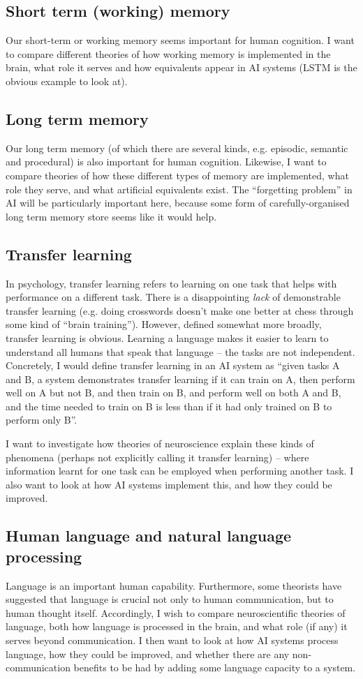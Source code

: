 \documentclass[10pt,a4paper]{article}
\newcommand{\nquote}[1]{``{#1}''}
\begin{document}
\subsection{Short term (working) memory}
Our short-term or working memory seems important for human cognition. I want to compare different theories of how working memory is implemented in the brain, what role it serves and how equivalents appear in AI systems (LSTM is the obvious example to look at).

\subsection{Long term memory}
Our long term memory (of which there are several kinds, e.g. episodic, semantic and procedural) is also important for human cognition. Likewise, I want to compare theories of how these different types of memory are implemented, what role they serve, and what artificial equivalents exist. The \nquote{forgetting problem} in AI will be particularly important here, because some form of carefully-organised long term memory store seems like it would help.

\subsection{Transfer learning}
In psychology, transfer learning refers to learning on one task that helps with performance on a different task. There is a disappointing \emph{lack} of demonstrable transfer learning (e.g. doing crosswords doesn't make one better at chess through some kind of \nquote{brain training}). However, defined somewhat more broadly, transfer learning is obvious. Learning a language makes it easier to learn to understand all humans that speak that language -- the tasks are not independent. Concretely, I would define transfer learning in an AI system as \nquote{given tasks A and B, a system demonstrates transfer learning if it can train on A, then perform well on A but not B, and then train on B, and perform well on both A and B, and the time needed to train on B is less than if it had only trained on B to perform only B}.

I want to investigate how theories of neuroscience explain these kinds of phenomena (perhaps not explicitly calling it transfer learning) -- where information learnt for one task can be employed when performing another task. I also want to look at how AI systems implement this, and how they could be improved.

\subsection{Human language and natural language processing}
Language is an important human capability. Furthermore, some theorists have suggested that language is crucial not only to human communication, but to human thought itself. Accordingly, I wish to compare neuroscientific theories of language, both how language is processed in the brain, and what role (if any) it serves beyond communication. I then want to look at how AI systems process language, how they could be improved, and whether there are any non-communication benefits to be had by adding some language capacity to a system.
\end{document}
